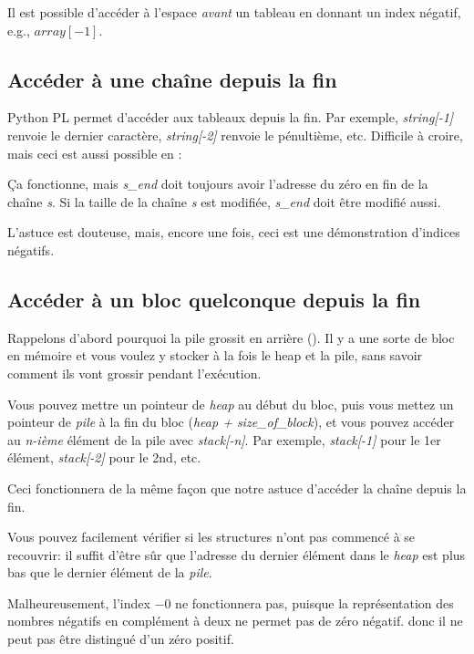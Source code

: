 \label{negative_array_indices}

Il est possible d'accéder à l'espace \emph{avant} un tableau en donnant un index négatif,
e.g., $array[-1]$.

\subsection{Accéder à une chaîne depuis la fin}

Python \ac{PL} permet d'accéder aux tableaux depuis la fin.
Par exemple, \emph{string[-1]} renvoie le dernier caractère, \emph{string[-2]} renvoie
le pénultième, etc.
Difficile à croire, mais ceci est aussi possible en \CCpp:



Ça fonctionne, mais \textit{s\_end} doit toujours avoir l'adresse du zéro en fin
de la chaîne \textit{s}. Si la taille de la chaîne \textit{s} est modifiée,
\textit{s\_end} doit être modifié aussi.

L'astuce est douteuse, mais, encore une fois, ceci est une démonstration d'indices
négatifs.

\subsection{Accéder à un bloc quelconque depuis la fin}

Rappelons d'abord pourquoi la pile grossit en arrière ().
Il y a une sorte de bloc en mémoire et vous voulez y stocker à la fois le heap et
la pile, sans savoir comment ils vont grossir pendant l'exécution.

Vous pouvez mettre un pointeur de \emph{heap} au début du bloc, puis vous mettez un
pointeur de \emph{pile} à la fin du bloc (\emph{heap + size\_of\_block}), et vous pouvez
accéder au \emph{n-ième} élément de la pile avec \emph{stack[-n]}.
Par exemple, \emph{stack[-1]} pour le 1er élément, \emph{stack[-2]} pour le 2nd, etc.

Ceci fonctionnera de la même façon que notre astuce d'accéder la chaîne depuis la
fin.

Vous pouvez facilement vérifier si les structures n'ont pas commencé à se recouvrir:
il suffit d'être sûr que l'adresse du dernier élément dans le \emph{heap} est plus
bas que le dernier élément de la \emph{pile}.

Malheureusement, l'index  $-0$ ne fonctionnera pas, puisque la représentation des
nombres négatifs en complément à deux ne permet pas de
zéro négatif. donc il ne peut pas être distingué d'un zéro positif.

